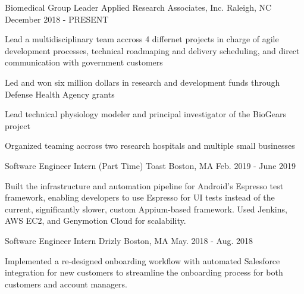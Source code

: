 
\begin{cventries}
  \cventry
    {Biomedical Group Leader} %
    {Applied Research Associates, Inc.} %
    {Raleigh, NC} %
    {December 2018 - PRESENT} %
    {
      \begin{cvitems} %
        \item {Lead a multidisciplinary team accross 4 differnet projects in charge of agile development processes, technical roadmaping and delivery scheduling, and direct communication with government customers}
        \item {Led and won six million dollars in research and development funds through Defense Health Agency grants}
        \item {Lead technical physiology modeler and principal investigator of the BioGears project}
        \item {Organized teaming accross two research hospitals and multiple small businesses}
      \end{cvitems}
    }

  \cventry
    {Software Engineer Intern (Part Time)} %
    {Toast} %
    {Boston, MA} %
    {Feb. 2019 - June 2019} %
    {
      \begin{cvitems} %
        \item {Built the infrastructure and automation pipeline for Android's Espresso test framework, enabling developers to use Espresso for UI tests instead of the current, significantly slower, custom Appium-based framework. Used Jenkins, AWS EC2, and Genymotion Cloud for scalability.}
      \end{cvitems}
    }

  \cventry
    {Software Engineer Intern} %
    {Drizly} %
    {Boston, MA} %
    {May. 2018 - Aug. 2018} %
    {
      \begin{cvitems} %
        \item {Implemented a re-designed onboarding workflow with automated Salesforce integration for new customers to streamline the onboarding process for both customers and account managers.}
      \end{cvitems}
    }


\end{cventries}
